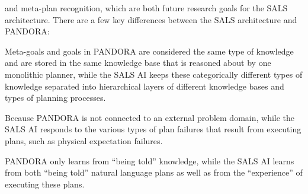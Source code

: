and meta-plan recognition, which are both future research goals for
the SALS architecture.  There are a few key differences between the
SALS architecture and PANDORA:
\begin{packed_enumerate}
\item{Meta-goals and goals in PANDORA are considered the same type of
  knowledge and are stored in the same knowledge base that is reasoned
  about by one monolithic planner, while the SALS AI keeps these
  categorically different types of knowledge separated into
  hierarchical layers of different knowledge bases and types of
  planning processes.}
\item{Because PANDORA is not connected to an external problem domain,
  while the SALS AI responds to the various types of plan failures
  that result from executing plans, such as physical expectation
  failures.}
\item{PANDORA only learns from ``being told'' knowledge, while the
  SALS AI learns from both ``being told'' natural language plans as
  well as from the ``experience'' of executing these plans.}
\end{packed_enumerate}







